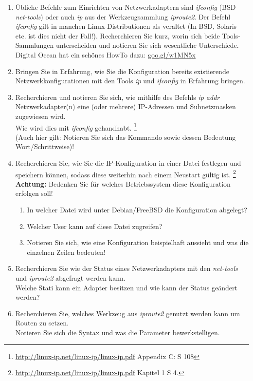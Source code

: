 \documentclass[paper=a4,fontsize=11pt]{scrartcl}%
\numberwithin{equation}{section}
\begin{document}
\begin{enumerate}
\begin{enumerate}
\begin{enumerate}
		\end{enumerate}
	\end{enumerate}
	\item Übliche Befehle zum Einrichten von Netzwerkadaptern sind \emph{ifconfig} (BSD \emph{net-tools}) oder auch \emph{ip} aus der Werkzeugsammlung \emph{iproute2}. Der Befehl \emph{ifconfig} gilt in manchen Linux-Distributionen als veraltet (In BSD, Solaris etc. ist dies nicht der Fall!). Recherchieren Sie kurz, worin sich beide Tools-Sammlungen unterscheiden und notieren Sie sich wesentliche Unterschiede.\\
	Digital Ocean hat ein schönes HowTo dazu: \url{goo.gl/w1MN5x}
 	\item Bringen Sie in Erfahrung, wie Sie die Konfiguration bereits existierende Netzwerkkonfigurationen mit den Tools \emph{ip} und \emph{ifconfig} in Erfahrung bringen.
	\item Recherchieren und notieren Sie sich, wie mithilfe des Befehls \emph{ip addr} Netzwerkadapter(n) eine (oder mehrere) IP-Adressen und Subnetzmasken zugewiesen wird.\\
	Wie wird dies mit \emph{ifconfig} gehandhabt. \footnote{\url{http://linux-ip.net/linux-ip/linux-ip.pdf} Appendix C: S 108}\\
	(Auch hier gilt: Notieren Sie sich das Kommando sowie dessen Bedeutung Wort/Schrittweise)!
	\item Recherchieren Sie, wie Sie die IP-Konfiguration in einer Datei festlegen und speichern können, sodass diese weiterhin nach einem Neustart gültig ist.  \footnote{\url{http://linux-ip.net/linux-ip/linux-ip.pdf} Kapitel 1 S 4.}\\
	\textbf{Achtung:} Bedenken Sie für welches Betriebssystem diese Konfiguration erfolgen soll!
	\begin{enumerate}
		\item In welcher Datei wird unter Debian/FreeBSD die Konfiguration abgelegt?
		\item Welcher User kann auf diese Datei zugreifen?
		\item Notieren Sie sich, wie eine Konfiguration beispielhaft aussieht und was die einzelnen Zeilen bedeuten!
	\end{enumerate}
	\item Recherchieren Sie wie der Status eines Netzwerkadapters mit den \emph{net-tools} und \emph{iproute2} abgefragt werden kann.\\
	Welche Stati kann ein Adapter besitzen und wie kann der Status geändert werden?
	\item Recherchieren Sie, welches Werkzeug aus \emph{iproute2} genutzt werden kann um Routen zu setzen.\\Notieren Sie sich die Syntax und was die Parameter bewerkstelligen.

\end{enumerate}
\end{document}
